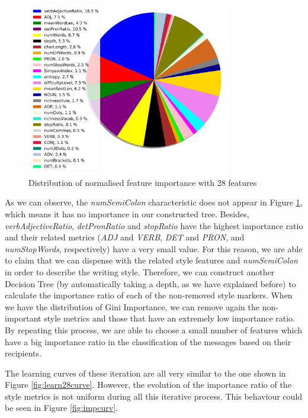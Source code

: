 \begin{figure}
	\centering%
	\centerline{\includegraphics[width=0.8\textwidth]{Imagenes/Bitmap/DecisionTrees/pie28.png}}%
	\caption{Distribution of normalised feature importance with 28 features}%
	\label{fig:nfi28}
\end{figure}

As we can observe, the \textit{numSemiColon} characteristic does not appear in Figure \ref{fig:nfi28}, which means it has no importance in our constructed tree. Besides, \textit{verbAdjectiveRatio}, \textit{detPronRatio} and \textit{stopRatio} have the highest importance ratio and their related metrics (\textit{ADJ} and \textit{VERB}, \textit{DET} and \textit{PRON}, and \textit{numStopWords}, respectively) have a very small value. For this reason, we are able to claim that we can dispense with the related style features and \textit{numSemiColon} in order to describe the writing style. Therefore, we can construct another Decision Tree (by automatically taking a depth, as we have explained before) to calculate the importance ratio of each of the non-removed style markers. When we have the distribution of Gini Importance, we can remove again the non-important style metrics and those that have an extremely low importance ratio. By repeating this process, we are able to choose a small number of features which have a big importance ratio in the classification of the messages based on their recipients.

The learning curves of these iteration are all very similar to the one shown in Figure \ref{fig:learn28curve}. However, the evolution of the importance ratio of the style metrics is not uniform during all this iterative process. This behaviour could be seen in Figure \ref{fig:impcurv}.

